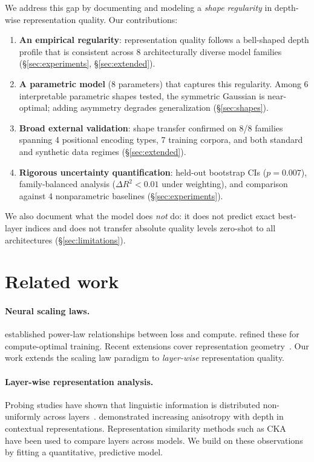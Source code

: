 \documentclass{article}
\begin{document}
We address this gap by documenting and modeling a \emph{shape regularity} in depth-wise representation quality. Our contributions:

\begin{enumerate}
    \item \textbf{An empirical regularity}: representation quality follows a bell-shaped depth profile that is consistent across 8 architecturally diverse model families (\S\ref{sec:experiments}, \S\ref{sec:extended}).
    \item \textbf{A parametric model} (8 parameters) that captures this regularity. Among 6 interpretable parametric shapes tested, the symmetric Gaussian is near-optimal; adding asymmetry degrades generalization (\S\ref{sec:shapes}).
    \item \textbf{Broad external validation}: shape transfer confirmed on 8/8 families spanning 4 positional encoding types, 7 training corpora, and both standard and synthetic data regimes (\S\ref{sec:extended}).
    \item \textbf{Rigorous uncertainty quantification}: held-out bootstrap CIs ($p = 0.007$), family-balanced analysis ($\Delta R^2 < 0.01$ under weighting), and comparison against 4 nonparametric baselines (\S\ref{sec:experiments}).
\end{enumerate}

We also document what the model does \emph{not} do: it does not predict exact best-layer indices and does not transfer absolute quality levels zero-shot to all architectures (\S\ref{sec:limitations}).

\section{Related work}
\label{sec:related}

\paragraph{Neural scaling laws.}
\citet{kaplan2020scaling} established power-law relationships between loss and compute. \citet{hoffmann2022training} refined these for compute-optimal training. Recent extensions cover representation geometry~\citep{huh2024platonic}. Our work extends the scaling law paradigm to \emph{layer-wise} representation quality.

\paragraph{Layer-wise representation analysis.}
Probing studies have shown that linguistic information is distributed non-uniformly across layers~\citep{tenney2019bert, liu2019linguistic, jawahar2019bert, rogers2020primer}. \citet{ethayarajh2019contextual} demonstrated increasing anisotropy with depth in contextual representations. Representation similarity methods such as CKA~\citep{kornblith2019similarity} have been used to compare layers across models. We build on these observations by fitting a quantitative, predictive model.
\end{document}
